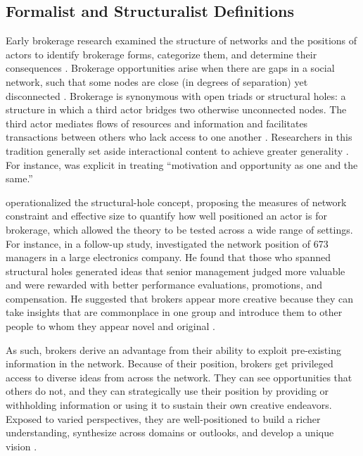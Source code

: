 \documentclass[
]{article}
\begin{document}
\subsection{Formalist and Structuralist Definitions}

Early brokerage research examined the structure of networks and the positions of actors to identify brokerage forms, categorize them, and determine their consequences \autocite{burtStructuralHolesSocial1992,burtStructuralHolesGood2004,gouldStructuresMediationFormal1989,granovetterStrengthWeakTies1973,marsdenBrokerageBehaviorRestricted1982,simmelConflictWebGroupAffiliations1964,simmelIndividualitySocialForms1971}. Brokerage opportunities arise when there are gaps in a social network, such that some nodes are close (in degrees of separation) yet disconnected \autocite{burtStructuralHolesSocial1992,burtStructuralHolesGood2004,marsdenBrokerageBehaviorRestricted1982}. Brokerage is synonymous with open triads or structural holes: a structure in which a third actor bridges two otherwise unconnected nodes. The third actor mediates flows of resources and information and facilitates transactions between others who lack access to one another \autocites[1457]{fernandezDilemmaStatePower1994}[202]{marsdenBrokerageBehaviorRestricted1982}. Researchers in this tradition generally set aside interactional content to achieve greater generality \autocite{eriksonFormalistRelationalistTheory2013}. For instance, \textcite[36]{burtStructuralHolesSocial1992} was explicit in treating ``motivation and opportunity as one and the same.''

\textcite{burtStructuralHolesSocial1992} operationalized the structural-hole concept, proposing the measures of network constraint and effective size to quantify how well positioned an actor is for brokerage, which allowed the theory to be tested across a wide range of settings. For instance, in a follow-up study, \textcite{burtStructuralHolesGood2004} investigated the network position of 673 managers in a large electronics company. He found that those who spanned structural holes generated ideas that senior management judged more valuable and were rewarded with better performance evaluations, promotions, and compensation. He suggested that brokers appear more creative because they can take insights that are commonplace in one group and introduce them to other people to whom they appear novel and original \autocite[388]{burtStructuralHolesGood2004}.

As such, brokers derive an advantage from their ability to exploit pre-existing information in the network. Because of their position, brokers get privileged access to diverse ideas from across the network. They can see opportunities that others do not, and they can strategically use their position by providing or withholding information \autocite{burtStructuralHolesSocial1992} or using it to sustain their own creative endeavors. Exposed to varied perspectives, they are well-positioned to build a richer understanding, synthesize across domains or outlooks, and develop a unique vision \autocite{burtStructuralHolesGood2004}.
\end{document}
